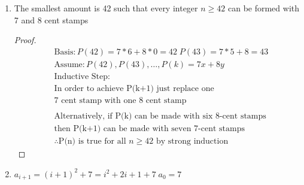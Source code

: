 \documentclass[11pt]{article}
\begin{document}
\begin{enumerate}
    \item The smallest amount is 42 such that every integer $n \ge 42$ can be formed with 7 and 8 cent stamps
        \begin{proof}
            \begin{align*}
                &\text{Basis}: P(42) =  7*6 + 8*0 = 42 \; P(43) =  7 * 5 + 8 = 43\\
                &\text{Assume}: P(42), P(43), \dots , P(k) = 7x+8y\\
                &\text{Inductive Step}: \\
                & \text{In order to achieve P(k+1) just replace one} \\
                &\text{7 cent stamp with one 8 cent stamp} \\
                & \\
                &\text{Alternatively, if P(k) can be made with six 8-cent stamps} \\
                &\text{then P(k+1) can be made with seven 7-cent stamps} \\ 
                &\therefore \text{P(n) is true for all $n \ge 42$ by strong induction}
            \end{align*}
        \end{proof}

    \item $ a_{i+1} = (i +1)^2 + 7 = i^2 + 2i + 1 + 7 \; a_0 = 7$

    \end{enumerate}
\end{document}
